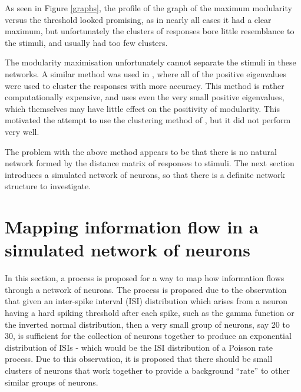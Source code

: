 As seen in Figure \ref{graphs}, the profile of the graph of the maximum 
modularity versus the threshold looked promising, as in nearly all cases it had 
a clear maximum, but unfortunately the clusters of responses bore little 
resemblance to the stimuli, and usually had too few clusters.


The modularity maximisation unfortunately cannot separate the stimuli in these networks. A similar method was used in \citep{Humphries2011a}, where all of the positive eigenvalues were used to 
cluster the responses with more accuracy. This method is 
rather computationally expensive, and uses even the very small positive 
eigenvalues, which themselves may have little effect on the positivity of modularity.  This motivated the attempt to use the clustering method of \citet{Newman2006b}, but it did not perform very well.

The problem with the above method appears to be that there is no natural network formed by the distance matrix of responses to stimuli. The next section introduces a simulated network of neurons, so that there is a definite network structure to investigate.

%

\section{Mapping information flow in a simulated network of neurons}

In this section, a process is proposed for a way to map how information flows through a network of neurons.  The process is proposed due to the observation that given an inter-spike interval (ISI) distribution which arises from a neuron having a hard spiking threshold after each spike, such as the gamma function or the inverted normal distribution, then a very small group of neurons, say 20 to 30, is sufficient for the collection of neurons together to produce an exponential distribution of ISIs - which would be the ISI distribution of a Poisson rate process.  Due to this observation, it is proposed that there should be small clusters of neurons that work together to provide a background ``rate'' to other similar groups of neurons.

